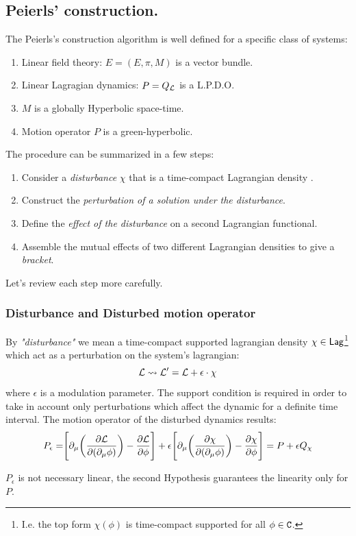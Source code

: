\documentclass[Main]{subfiles}
\begin{document}
	\subsection{Peierls' construction.}
	The Peierls's construction algorithm is well defined for a specific class of systems:
		\begin{enumerate}
			\item Linear field theory: $E=(E,\pi,M)$ is a vector bundle.
			\item Linear Lagragian dynamics: $P=Q_{\mathcal{L}}$ is a L.P.D.O.
			\item $M$ is a globally Hyperbolic space-time.
			\item Motion operator $P$ is a green-hyperbolic.
		\end{enumerate}	
	The procedure can be summarized in a few steps:
	\begin{enumerate}
		\item Consider a \emph{disturbance} $\chi$ that is a time-compact Lagrangian density .
		\item Construct the \emph{perturbation of a solution under the disturbance}.
		\item Define the \emph{effect of the disturbance} on a second Lagrangian functional.
		\item Assemble the mutual effects of two different Lagrangian densities to give a \emph{bracket}.
	\end{enumerate}	
	Let's review each step more carefully.
	
	\subsubsection{Disturbance and Disturbed motion operator }
		By \emph{"disturbance"} we mean a time-compact supported lagrangian density $\chi \in \mathsf{Lag}$\footnote{I.e. the top form $\chi(\phi)$ is time-compact supported for all $\phi \in \mathtt{C}$.} which act as a perturbation on the system's lagrangian:
		\begin{displaymath}
			\mathcal{L} \rightsquigarrow \mathcal{L}' = \mathcal{L} + \epsilon\cdot \chi
		\end{displaymath}
		where $\epsilon$  is a modulation parameter.
		The support condition is required in order to take in account only perturbations which affect the dynamic for a definite time interval.
		The motion operator of the disturbed dynamics results:
		\begin{equation}
			P_\epsilon = \Biggr[ \partial_\mu \biggr( \frac{\partial \mathcal{L}}{\partial(\partial_\mu \phi)} \biggr) - \frac{\partial \mathcal{L}}{\partial \phi} \Biggr] + \epsilon \Biggr[ \partial_\mu \biggr( \frac{\partial \chi}{\partial(\partial_\mu \phi)} \biggr) - \frac{\partial \chi}{\partial \phi} \Biggr]
			= P + \epsilon Q_\chi		
		\end{equation}
		\begin{observation}
			$P_\epsilon$ is not necessary linear, the second Hypothesis guarantees the linearity only for $P$.
		\end{observation}
\end{document}
